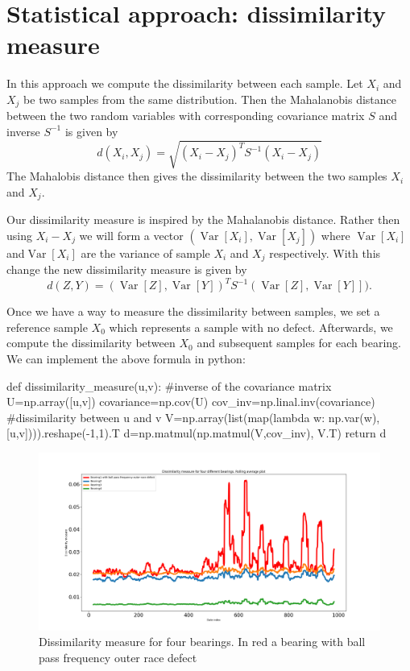 \documentclass[11pt, oneside]{article}   	%
\newcommand{\Var}{\operatorname{Var}}
\begin{document}
\section{Statistical approach: dissimilarity measure}
In this approach we compute the dissimilarity between each sample. Let $X_{i}$ and $X_{j}$ be two samples from the same distribution. Then the Mahalanobis distance between the two random variables with corresponding covariance matrix $S$ and inverse $S^{-1}$ is given by
\begin{equation}
d(X_{i}, X_{j}) = \sqrt{  \left(  X_{i}- X_{j} \right)^{T}S^{-1} \left(  X_{i}- X_{j} \right)    }
\end{equation}
The Mahalobis distance then gives the dissimilarity between the two samples $X_{i}$ and $X_{j}$.
\begin{flushleft}
Our dissimilarity measure is inspired by the Mahalanobis distance. Rather then using $X_{i}-X_{j}$ we will form a vector $\left(\Var[X_{i}], \Var[X_{j}]\right)$ where $\Var[X_{i}]$ and$\Var[X_{i}]$ are the variance of sample $X_{i}$ and $X_{j}$ respectively. With this change the new dissimilarity measure is given by 
\begin{equation}
d(Z, Y) =  \left(  \Var[Z], \Var[Y] \right)^{T}S^{-1} \left( \Var[Z], \Var[Y] \right]) .
\end{equation}
\end{flushleft}
Once we have a way to measure the dissimilarity between samples, we set a reference sample $X_{0}$ which represents a sample with no defect. Afterwards,  we compute the dissimilarity between $X_{0}$ and subsequent samples for each bearing.
We can implement the above formula in python:

\begin{python}
def dissimilarity_measure(u,v):
	#inverse of the covariance matrix
	U=np.array([u,v])
	covariance=np.cov(U)
	cov_inv=np.linal.inv(covariance)
	#dissimilarity between u and v
	V=np.array(list(map(lambda w: np.var(w),[u,v]))).reshape(-1,1).T
	d=np.matmul(np.matmul(V,cov_inv), V.T)
	return d
\end{python}
\begin{figure}[H] %
   \centering
   \includegraphics[width=7in]{statistics_dissimilarity_bpfo} 
   \caption{Dissimilarity measure for four bearings. In red a bearing with ball pass frequency outer race defect}
   \label{fig:example}
\end{figure}
\end{document}
